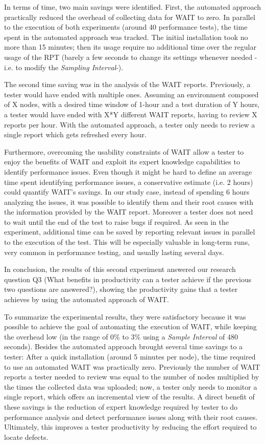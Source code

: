 \documentclass[runningheads,a4paper]{llncs}
\begin{document}
In terms of time, two main savings were identified. First, the automated
approach practically reduced the overhead of collecting data for WAIT to zero.
In parallel to the execution of both experiments (around 40 performance tests),
the time spent in the automated approach was tracked. The initial installation
took no more than 15 minutes; then its usage require no additional time over the
regular usage of the RPT (barely a few seconds to change its settings whenever
needed -i.e. to modify the \emph{Sampling Interval}-). 

The second time saving was in the analysis of the WAIT reports. Previously, a
tester would have ended with multiple ones. Assuming an environment composed of
X nodes, with a desired time window of 1-hour and a test duration of Y hours, a
tester would have ended with X*Y different WAIT reports, having to review X
reports per hour. With the automated approach, a tester only needs to review a
single report which gets refreshed every hour.

Furthermore, overcoming the usability constraints of WAIT allow a tester
to enjoy the benefits of WAIT and exploit its expert knowledge
capabilities
to identify performance issues.  Even though it might be hard to define an
average time spent identifying performance issues, a conservative estimate (i.e.
2 hours) could quantify WAIT's savings. In our study case, instead of spending 6
hours analyzing the issues, it was possible to identify them and their root
causes with the information provided by the WAIT report. Moreover a tester does
not need to wait until the end of the test to raise bugs if required. As seen in
the experiment, additional time can be saved by reporting relevant issues in
parallel to the execution of the test. This will be especially valuable in
long-term runs, very common in performance testing, and usually lasting several
days.

In conclusion, the results of this second experiment answered our research
question Q3 (What benefits in productivity can a tester achieve if the previous
two questions are answered?), showing the productivity gains that a tester
achieves by using the automated approach of WAIT.

To summarize the experimental results, they were satisfactory because it
was possible to achieve the goal of automating the execution of WAIT,
while keeping the overhead low (in the range of 0\% to 3\% using a \emph{Sample
Interval} of 480 seconds). Besides the automated approach brought several time
savings to a tester: After a quick installation (around 5 minutes per node), the
time required to use an automated WAIT was practically zero. Previously the
number of WAIT reports a tester needed to review was equal to the number of
nodes multiplied by the times the collected data was uploaded; now, a tester
only needs to monitor a single report, which offers an incremental view of the
results. A direct benefit of these savings is the reduction of expert knowledge
required by tester to do performance analysis and detect performance
issues along with their root causes. Ultimately, this improves a tester
productivity by reducing the effort required to locate defects.
\vspace{-5pt}
\end{document}

